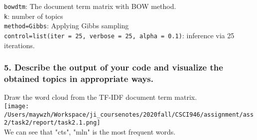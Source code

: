 \documentclass[
]{article}
\begin{document}
\texttt{bowdtm}: The document term matrix with BOW method.\\
\texttt{k}: number of topics\\
\texttt{method=Gibbs}: Applying Gibbs sampling\\
\texttt{control=list(iter\ =\ 25,\ verbose\ =\ 25,\ alpha\ =\ 0.1)}:
inference via 25 iterations.

\hypertarget{header-n29}{%
\subsubsection{5. Describe the output of your code and visualize the
obtained topics in appropriate ways.}\label{header-n29}}

Draw the word cloud from the TF-IDF document term matrix.\\
\texttt{[image: /Users/maywzh/Workspace/ji\_coursenotes/2020fall/CSCI946/assignment/ass2/task2/report/task2.1.png]}\\
We can see that "cts", "mln" is the most frequent words.
\end{document}
